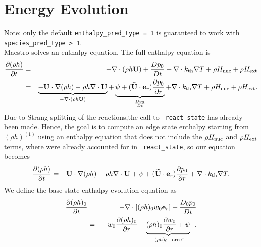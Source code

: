 \section{Energy Evolution}

Note: only the default {\tt enthalpy\_pred\_type = 1} is guaranteed to work
with {\tt species\_pred\_type > 1}. \\

Maestro solves an enthalpy equation.  
The full enthalpy equation is
\begin{eqnarray}
\frac{\partial(\rho h)}{\partial t} &=& -\nabla\cdot(\rho h {\bf U}) + \frac{Dp_0}{Dt} 
+ \nabla\cdot k_{\rm th} \nabla T + \rho H_{\rm nuc} + \rho H_{\rm ext} \nonumber \\
&=& \underbrace{-{\bf U}\cdot\nabla(\rho h) - \rho h\nabla\cdot{\bf U}}_{-\nabla\cdot(\rho h{\bf U})} 
+ \underbrace{\psi + (\widetilde{{\bf U}} \cdot \mathbf{e}_r) \frac{\partial p_0}{\partial r}}_{\frac{Dp_0}{Dt}} 
+ \nabla\cdot k_{\rm th}\nabla T + \rho H_{\rm nuc} + \rho H_{\rm ext}.
\end{eqnarray}
Due to Strang-splitting of the reactions,the call to {\tt
  react\_state} has already been made.  Hence, the goal is to compute
an edge state enthalpy starting from $(\rho h)^{(1)}$ using an
enthalpy equation that does not include the $\rho H_{\rm nuc}$ and
$\rho H_{\rm ext}$ terms, where were already accounted for in {\tt
  react\_state}, so our equation becomes
\begin{equation}
\frac{\partial(\rho h)}{\partial t} = -{\bf U}\cdot\nabla(\rho h) - \rho h\nabla\cdot{\bf U} 
+ \psi + (\widetilde{{\bf U}} \cdot \mathbf{e}_r) \frac{\partial p_0}{\partial r} + \nabla\cdot k_{\rm th}\nabla T. \label{rhoh equation}
\end{equation}
We define the base state enthalpy evolution equation as
\begin{eqnarray}
\frac{\partial(\rho h)_0}{\partial t} &=& -\nabla\cdot[(\rho h)_0 w_0{\bf e}_r] 
+ \frac{D_0p_0}{Dt} \nonumber \\
&=& -w_0\frac{\partial(\rho h)_0}{\partial r} 
- \underbrace{(\rho h)_0\frac{\partial w_0}{\partial r}+ \psi}_{``(\rho h)_0 ~ \text{force}"}
\enskip .\label{rhoh0 equation}
\end{eqnarray}
